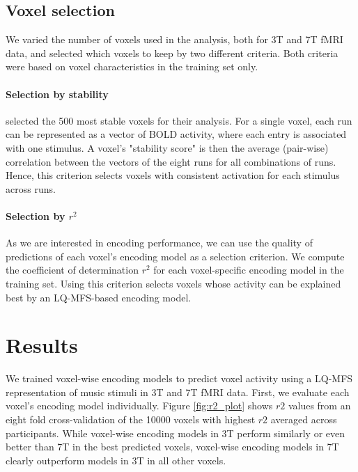 \subsection*{Voxel selection}

We varied the number of voxels used in the analysis, both for 3T and 7T
f{MRI} data, and selected which voxels to keep by two different criteria. Both
criteria were based on voxel characteristics in the training set only.

\paragraph{Selection by stability}

\citet{ML08} selected the 500 most stable voxels for their analysis. For a
single voxel, each run can be represented as a vector of BOLD activity, where
each entry is associated with one stimulus. A voxel's "stability score" is then
the average (pair-wise) correlation between the vectors of the eight runs for
all combinations of runs. Hence, this criterion selects voxels with consistent
activation for each stimulus across runs.

\paragraph{Selection by $r^2$}

As we are interested in encoding performance, we can use the quality of
predictions of each voxel's encoding model as a selection criterion. We compute
the coefficient of determination $r^2$ for each voxel-specific encoding model
in the training set. Using this criterion selects voxels whose activity can be
explained best by an LQ-MFS-based encoding model.

\section*{Results}

We trained voxel-wise encoding models to predict voxel activity using a LQ-MFS
representation of music stimuli in 3T and 7T f{MRI} data.
First, we evaluate each voxel's encoding model individually.
Figure \ref{fig:r2_plot} shows $r2$ values from an eight fold cross-validation
of the 10000 voxels with highest $r2$ averaged across participants.
While voxel-wise encoding models in 3T perform similarly or even better than 7T
in the best predicted voxels, voxel-wise encoding models in 7T clearly
outperform models in 3T in all other voxels.

